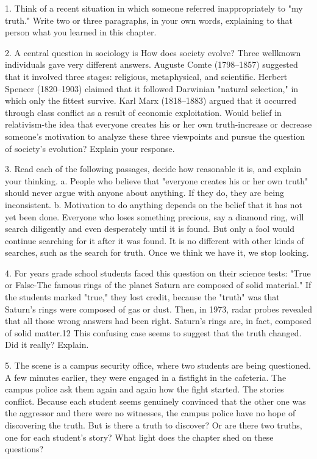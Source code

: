 \documentclass{book}
\begin{document}
1. Think of a recent situation in which someone referred inappropriately to "my truth." Write two or three paragraphs, in your own words, explaining to that person what you learned in this chapter.

2. A central question in sociology is How does society evolve? Three wellknown individuals gave very different answers. Auguste Comte (1798–1857) suggested that it involved three stages: religious, metaphysical, and scientific. Herbert Spencer (1820–1903) claimed that it followed Darwinian "natural selection," in which only the fittest survive. Karl Marx (1818–1883) argued that it occurred through class conflict as a result of economic exploitation. Would belief in relativism-the idea that everyone creates his or her own truth-increase or decrease someone’s motivation to analyze these three viewpoints and pursue the question of society’s evolution? Explain your response.

3. Read each of the following passages, decide how reasonable it is, and explain your thinking. 
a. People who believe that "everyone creates his or her own truth" should never argue with anyone about anything. If they do, they are being inconsistent. 
b. Motivation to do anything depends on the belief that it has not yet been done. Everyone who loses something precious, say a diamond ring, will search diligently and even desperately until it is found. But only a fool would continue searching for it after it was found. It is no different with other kinds of searches, such as the search for truth. Once we think we have it, we stop looking.

4. For years grade school students faced this question on their science tests: "True or False-The famous rings of the planet Saturn are composed of solid material." If the students marked "true," they lost credit, because the "truth" was that Saturn’s rings were composed of gas or dust. Then, in 1973, radar probes revealed that all those wrong answers had been right. Saturn’s rings are, in fact, composed of solid matter.12 This confusing case seems to suggest that the truth changed. Did it really? Explain.

5. The scene is a campus security office, where two students are being questioned. A few minutes earlier, they were engaged in a fistfight in the cafeteria. The campus police ask them again and again how the fight started. The stories conflict. Because each student seems genuinely convinced that the other one was the aggressor and there were no witnesses, the campus police have no hope of discovering the truth. But is there a truth to discover? Or are there two truths, one for each student’s story? What light does the chapter shed on these questions?
\end{document}
